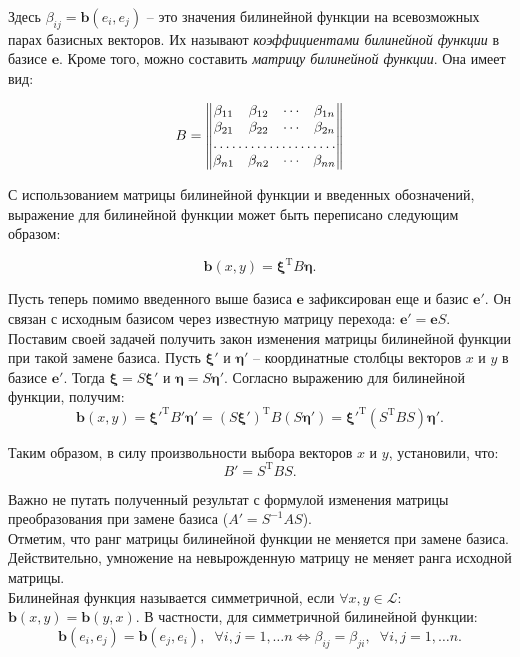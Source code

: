 Здесь $\beta_{ij}=\mathbf{b}(e_i,e_j)$ -- это значения билинейной функции на всевозможных парах базисных векторов. Их называют\textit{ коэффициентами билинейной функции} в базисе $\mathbf{e}$. Кроме того, можно составить \textit{матрицу билинейной функции}. Она имеет вид:

$$B=\begin{Vmatrix}
\beta_{11} & \beta_{12} & \cdots & \beta_{1n}\\
\beta_{21} & \beta_{22} & \cdots & \beta_{2n}\\
 \hdotsfor{4} \\
\beta_{n1} & \beta_{n2} & \cdots & \beta_{nn}
\end{Vmatrix}$$

С использованием матрицы билинейной функции и введенных обозначений, выражение для билинейной функции может быть переписано следующим образом:

$$\mathbf{b}(x,y)=\bm{\xi}^{\text{T}}B\bm{\eta}.$$

Пусть теперь помимо введенного выше базиса $\mathbf{e}$ зафиксирован еще и базис $\mathbf{e'}$. Он связан с исходным базисом через известную матрицу перехода: $\mathbf{e}'=\mathbf{e}S.$ Поставим своей задачей получить закон изменения матрицы билинейной функции при такой замене базиса. Пусть $\bm{\xi'}$ и $\bm{\eta'}$ -- координатные столбцы векторов $x$ и $y$ в базисе $\mathbf{e'}$. Тогда $\bm{\xi}=S\bm{\xi'}$ и $\bm{\eta}=S\bm{\eta'}$. Согласно выражению для билинейной функции, получим:$$\mathbf{b}(x,y)=\bm{\xi'}^{\text{T}}B'\bm{\eta'}=(S\bm{\xi'})^{\text{T}}B(S\bm{\eta'})=\bm{\xi'}^{\text{T}}(S^{\text{T}}BS)\bm{\eta'}.$$

Таким образом, в силу произвольности выбора векторов $x$ и $y$, установили, что:$$B'=S^{\text{T}}BS.$$

Важно не путать полученный результат с формулой изменения матрицы преобразования при замене базиса ($A'=S^{-1}AS$). \\

Отметим, что ранг матрицы билинейной функции не меняется при замене базиса. Действительно, умножение на невырожденную матрицу не меняет ранга исходной матрицы.\\

Билинейная функция называется симметричной, если $\forall x,y\in \mathcal{L}:$  $\mathbf{b}(x,y)=\mathbf{b}(y,x)$.
В частности, для симметричной билинейной функции:$$\mathbf{b}(e_i,e_j)=\mathbf{b}(e_j,e_i),\hspace{7pt} \forall i,j=1,\ldots n \Leftrightarrow \beta_{ij}=\beta_{ji},\hspace{7pt} \forall i,j=1,\ldots n. $$

